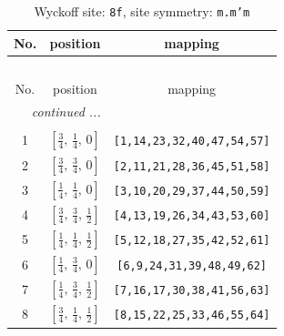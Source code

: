 \documentclass[fleqn,8pt]{jsarticle}
\begin{document}
\begin{longtable}{ccc}
\caption{Wyckoff site: {\tt 8f}, site symmetry: {\tt m.m'm}}
 \\
 \hline \hline
No. & position & mapping \\ \hline \endfirsthead

\multicolumn{2}{l}{\tablename\ \thetable{}} \\
 \hline \hline
No. & position & mapping \\ \hline \endhead

 \hline \hline
\multicolumn{2}{r}{\footnotesize\it continued ...} \\ \endfoot

 \hline \hline
\multicolumn{2}{r}{} \\ \endlastfoot

1 & $\left[ \frac{3}{4},\, \frac{1}{4},\, 0 \right]$ & {\tt [1,14,23,32,40,47,54,57]} \\ \hline
2 & $\left[ \frac{3}{4},\, \frac{3}{4},\, 0 \right]$ & {\tt [2,11,21,28,36,45,51,58]} \\ \hline
3 & $\left[ \frac{1}{4},\, \frac{1}{4},\, 0 \right]$ & {\tt [3,10,20,29,37,44,50,59]} \\ \hline
4 & $\left[ \frac{3}{4},\, \frac{3}{4},\, \frac{1}{2} \right]$ & {\tt [4,13,19,26,34,43,53,60]} \\ \hline
5 & $\left[ \frac{1}{4},\, \frac{1}{4},\, \frac{1}{2} \right]$ & {\tt [5,12,18,27,35,42,52,61]} \\ \hline
6 & $\left[ \frac{1}{4},\, \frac{3}{4},\, 0 \right]$ & {\tt [6,9,24,31,39,48,49,62]} \\ \hline
7 & $\left[ \frac{1}{4},\, \frac{3}{4},\, \frac{1}{2} \right]$ & {\tt [7,16,17,30,38,41,56,63]} \\ \hline
8 & $\left[ \frac{3}{4},\, \frac{1}{4},\, \frac{1}{2} \right]$ & {\tt [8,15,22,25,33,46,55,64]} \\
\end{longtable}
\renewcommand{\arraystretch}{1.2}
\end{document}
